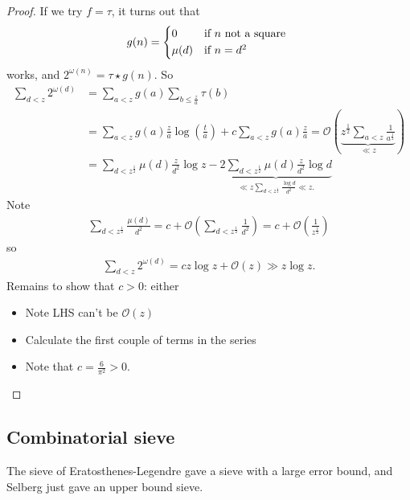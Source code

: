 \documentclass{article}
\newcommand{\bigO}{\mathcal{O}}
\begin{document}
\begin{proof}
  If we try $f = \tau$, it turns out that
  \begin{equation*}
    g(n)=
    \begin{cases*}
      0 & if $n$ not a square \\
      \mu(d) & if $n=d^2$
    \end{cases*}
  \end{equation*}
  works, and $2^{\omega(n)} = \tau \star g(n)$.
  So
  \begin{align*}
    \sum_{d < z} 2^{\omega(d)} &= \sum_{a < z} g(a) \sum_{b \leq \frac za} \tau(b) \\
                               &= \sum_{a < z} g(a) \frac{z}{a} \log(\frac{t}{a}) + c \sum_{a < z} g(a) \frac{z}{a} = \bigO\left(\underbrace{z^{\frac{1}{2}} \sum_{a < z} \frac{1}{a^{\frac{1}{2}}}}_{\ll z}\right) \\
                               &= \sum_{d < z^{\frac{1}{2}}} \mu(d) \frac{z}{d^2} \log z - \underbrace{2 \sum_{d < z^{\frac{1}{2}}} \mu(d) \frac{z}{d^2} \log d}_{\ll z \sum_{d < z^{\frac 12}} \frac{\log d}{d^2} \ll z.}
  \end{align*}
  Note
  \begin{align*}
    \sum_{d < z^{\frac 12}} \frac{\mu(d)}{d^2} = c + \bigO\left(\sum_{d < z^{\frac 12}} \frac{1}{d^2}\right) = c + \bigO\left(\frac{1}{z^{\frac12}}\right)
  \end{align*}
  so
  \begin{align*}
    \sum_{d < z} 2^{\omega(d)} = c z \log z + \bigO(z) \gg z \log z.
  \end{align*}
  Remains to show that $c > 0$: either
  \begin{itemize}
    \item Note LHS can't be $\bigO(z)$
    \item Calculate the first couple of terms in the series
    \item Note that $c = \frac{6}{\pi^2} > 0$. \qedhere
  \end{itemize}
\end{proof}

\subsection{Combinatorial sieve}
The sieve of Eratosthenes-Legendre gave a sieve with a large error bound, and Selberg just gave an upper bound sieve.
\end{document}
